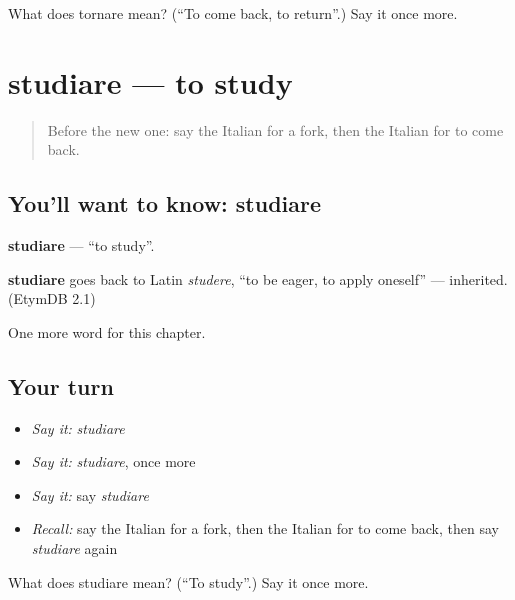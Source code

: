 \begin{tcolorbox}[breakable,colback=teal!4,colframe=teal!35!black,title={Before you move on}]
What does tornare mean? (\textquotedblleft{}To come back, to return\textquotedblright{}.) Say it once more.
\end{tcolorbox}
\section[studiare]{studiare — to study}

\label{lesson:IT-C60-studiare}



\begin{quote}
Before the new one: say the Italian for a fork, then the Italian for to come back.
\end{quote}

\subsection*{You'll want to know: studiare}
\textbf{studiare} — \textquotedblleft{}to study\textquotedblright{}.

\begin{cousinweb}
\textbf{studiare} goes back to Latin \emph{studere}, \textquotedblleft{}to be eager, to apply oneself\textquotedblright{} — inherited. (EtymDB 2.1)
\end{cousinweb}

\begin{grammarlens}[title={What you've built}]
One more word for this chapter.
\end{grammarlens}

\subsection*{Your turn}
\begin{itemize}
\raggedright
  \item \emph{Say it:} \emph{studiare}
  \item \emph{Say it:} \emph{studiare}, once more
  \item \emph{Say it:} say \emph{studiare}
  \item \emph{Recall:} say the Italian for a fork, then the Italian for to come back, then say \emph{studiare} again
\end{itemize}

\begin{tcolorbox}[breakable,colback=teal!4,colframe=teal!35!black,title={Before you move on}]
What does studiare mean? (\textquotedblleft{}To study\textquotedblright{}.) Say it once more.
\end{tcolorbox}
